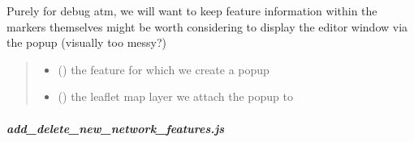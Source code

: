 \documentclass[letterpaper,10pt,english]{sphinxmanual}
\begin{document}
\begin{fulllineitems}
\label{\detokenize{docs_gui/js_api/network_editor/display_editable_network_features:createPopup}}
\pysigstartsignatures
{}
\pysigstopsignatures
\sphinxAtStartPar
Purely for debug atm, we will want to keep feature information within the markers themselves
might be worth considering to display the editor window via the popup (visually too messy?)
\begin{quote}\begin{description}
\begin{itemize}
\item {} 
\sphinxAtStartPar
{} () \textendash{} the feature for which we create a popup

\item {} 
\sphinxAtStartPar
{} () \textendash{} the leaflet map layer we attach the popup to

\end{itemize}

\end{description}\end{quote}

\end{fulllineitems}


\sphinxstepscope


\subparagraph{add\_delete\_new\_network\_features.js}
\label{\detokenize{docs_gui/js_api/network_editor/add_delete_new_network_features:add-delete-new-network-features-js}}\label{\detokenize{docs_gui/js_api/network_editor/add_delete_new_network_features::doc}}
\end{document}
